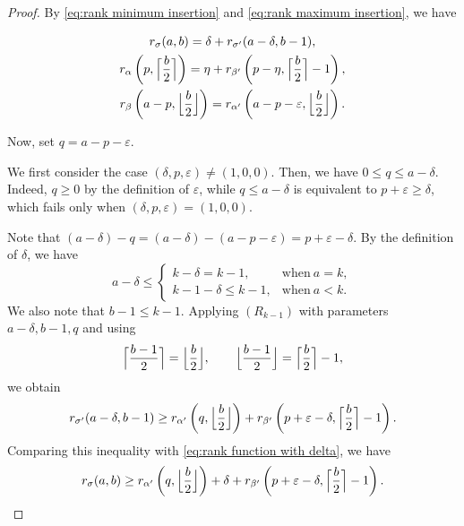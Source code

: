 \documentclass[12pt]{amsart}
\DeclarePairedDelimiter\ceil{\lceil}{\rceil}
\DeclarePairedDelimiter\floor{\lfloor}{\rfloor}
\theoremstyle{definition}
\numberwithin{equation}{section}
\begin{document}
\begin{proof}
By \eqref{eq:rank minimum insertion} and
\eqref{eq:rank maximum insertion}, we have

\begin{gather}
r_\sigma(a,b)
=
\delta+r_{\sigma'}(a-\delta,b-1),\label{eq:rank function with delta}\\
r_\alpha\left(p,\ceil[\Big]{\frac{b}{2}}\right)
=
\eta+
r_{\beta'}\left(
p-\eta,
\ceil[\Big]{\frac{b}{2}}-1
\right),\label{eq:rank function alpha}\\
r_\beta\left(a-p,\floor[\Big]{\frac{b}{2}}\right)
=
r_{\alpha'}\left(
a-p-\varepsilon,
\floor[\Big]{\frac{b}{2}}
\right).\label{eq:rank function beta}
\end{gather}

Now, set $q=a-p-\varepsilon$.

We first consider the case $(\delta,p,\varepsilon)\neq(1,0,0)$.
Then, we have $0\leq q\leq a-\delta$.
Indeed, $q\geq0$ by the definition of $\varepsilon$, while
$q\leq a-\delta$ is equivalent to $p+\varepsilon\geq\delta$, which
fails only when $(\delta,p,\varepsilon)=(1,0,0)$.

Note that $(a-\delta)-q = (a-\delta)-(a-p-\varepsilon) =p+\varepsilon -\delta$. By the definition of $\delta$, we have \begin{equation*}
a-\delta \leq
\begin{cases}
k - \delta = k -1, &\text{when} \ a = k,\\[4pt]
k-1-\delta \leq k-1, &\text{when} \ a < k.
\end{cases}
\end{equation*}
We also note that $b-1 \leq k-1$.
Applying $(R_{k-1})$ with parameters $a-\delta,b-1,q$ and using
\begin{equation*}
\ceil[\Big]{\frac{b-1}{2}}
=
\floor[\Big]{\frac{b}{2}},
\qquad
\floor[\Big]{\frac{b-1}{2}}
=
\ceil[\Big]{\frac{b}{2}}-1,
\end{equation*}
we obtain
\begin{equation*}
r_{\sigma'}(a-\delta,b-1)
\geq{}
r_{\alpha'}\left(
q,
\floor[\Big]{\frac{b}{2}}
\right) +
r_{\beta'}\left(
p+\varepsilon-\delta,
\ceil[\Big]{\frac{b}{2}}-1
\right).
\end{equation*}
Comparing this inequality with \eqref{eq:rank function with delta}, we have
\begin{equation}\label{eq:NW first ineq}
r_\sigma(a,b)
\geq{}
r_{\alpha'}\left(
q,
\floor[\Big]{\frac{b}{2}}
\right)+
\delta+
r_{\beta'}\left(
p+\varepsilon-\delta,
\ceil[\Big]{\frac{b}{2}}-1
\right).
\end{equation}


\end{proof}
\end{document}
